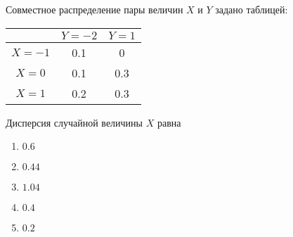 \documentclass[t]{beamer}
\begin{document}
 \begin{frame} \label{15} 
\begin{block}{15} 

Совместное распределение пары величин $X$ и $Y$ задано таблицей:

\begin{center}
\begin{tabular}{c|cc}
 & $Y=-2$ & $Y=1$ \\
\hline
$X=-1$ & 0.1 & 0 \\
$X=0$ & 0.1 & 0.3 \\
$X=1$ & 0.2 & 0.3 \\
\end{tabular}
\end{center}
\vspace{0.2cm} 
 
 Дисперсия случайной величины $X$ равна
 


 \end{block} 
\begin{enumerate} 
\item[] \hyperlink{15-No}{\beamergotobutton{} $0.6$}
\item[] \hyperlink{15-Yes}{\beamergotobutton{} $0.44$}
\item[] \hyperlink{15-No}{\beamergotobutton{} $1.04$
}
\item[] \hyperlink{15-No}{\beamergotobutton{} $0.4$}
\item[] \hyperlink{15-No}{\beamergotobutton{} $0.2$}
\end{enumerate} 
\end{frame} 
\end{document}
